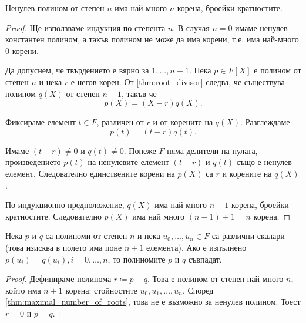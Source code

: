 \documentclass[
  headings=standardclasses,
  bibliography=totocnumbered,
]{scrartcl}
\begin{document}
\begin{lemma}\label{thm:maximal_number_of_roots}
  Ненулев полином от степен \( n \) има най-много \( n \) корена, броейки кратностите.
\end{lemma}
\begin{proof}
  Ще използваме индукция по степента \( n \). В случая \( n = 0 \) имаме ненулев константен полином, а такъв полином не може да има корени, т.е. има най-много \( 0 \) корени.

  Да допуснем, че твърдението е вярно за \( 1, \ldots, n - 1 \). Нека \( p \in F[X] \) е полином от степен \( n \) и нека \( r \) е негов корен. От \cref{thm:root_divisor} следва, че съществува полином \( q(X) \) от степен \( n - 1 \), такъв че
  \begin{equation*}
    p(X) = (X - r) q(X).
  \end{equation*}

  Фиксираме елемент \( t \in F \), различен от \( r \) и от корените на \( q(X) \). Разглеждаме
  \begin{equation*}
    p(t) = (t - r) q(t).
  \end{equation*}

  Имаме \( (t - r) \neq 0 \) и \( q(t) \neq 0 \). Понеже \( F \) няма делители на нулата, произведението \( p(t) \) на ненулевите елемент \( (t - r) \) и \( q(t) \) също е ненулев елемент. Следователно единствените корени на \( p(X) \) са \( r \) и корените на \( q(X) \).

  По индукционно предположение, \( q(X) \) има най-много \( n - 1 \) корена, броейки кратностите. Следователно \( p(X) \) има най много \( (n - 1) + 1 = n \) корена.
\end{proof}

\begin{theorem}\label{thm:coefficient_comparison_principle}
  Нека \( p \) и \( q \) са полиноми от степен \( n \) и нека \( u_0, \ldots, u_n \in F \) са различни скалари (това изисква в полето има поне \( n+1 \) елемента). Ако е изпълнено \( p(u_i) = q(u_i), i = 0, \ldots, n \), то полиномите \( p \) и \( q \) съвпадат.
\end{theorem}
\begin{proof}
  Дефинираме полинома \( r \coloneqq p - q \). Това е полином от степен най-много \( n \), който има \( n + 1 \) корена: стойностите \( u_0, u_1, \ldots, u_n \). Според \cref{thm:maximal_number_of_roots}, това не е възможно за ненулев полином. Тоест \( r = 0 \) и \( p = q \).
\end{proof}
\end{document}
